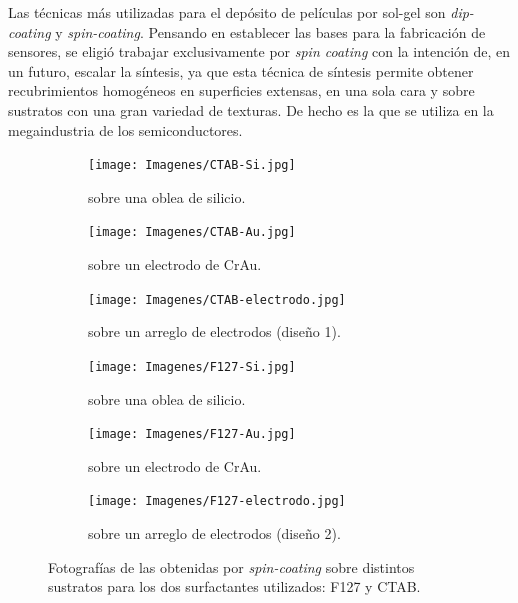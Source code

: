 		Las técnicas más utilizadas para el depósito de películas por sol-gel son \textit{dip-coating} y \textit{spin-coating}. 
		Pensando en establecer las bases para la fabricación de sensores, se eligió trabajar exclusivamente por \textit{spin coating} con la intención de, en un futuro, escalar la síntesis, ya que esta técnica de síntesis permite obtener recubrimientos homogéneos en superficies extensas, en una sola cara y sobre sustratos con una gran variedad de texturas. De hecho es la que se utiliza en la megaindustria de los semiconductores.\cite{Franssila2004,Jaeger2001} 

		

			\begin{figure}[hb!]
	 	   	    \begin{subfigure}[t]{0.325\textwidth}
		        	\texttt{[image: Imagenes/CTAB-Si.jpg]}
		       		\caption{\pdmC\space sobre una oblea de silicio.}
		         	\label{fig:F127_vidrio}
		     		\end{subfigure}
	     		\begin{subfigure}[t]{0.325\textwidth}
		        	\texttt{[image: Imagenes/CTAB-Au.jpg]}
		       		\caption{\pdmC\space sobre un electrodo de Cr\textbar Au.}
		         	\label{fig:F127_silicio}
		     		\end{subfigure}
	     		\begin{subfigure}[t]{0.325\textwidth}
		        	\texttt{[image: Imagenes/CTAB-electrodo.jpg]}
		       		\caption{\pdmC\space sobre un arreglo de electrodos (diseño 1).}
		         	\label{fig:F127_Au}
		     		\end{subfigure}
	 	   	    \begin{subfigure}[t]{0.325\textwidth}
		        	\texttt{[image: Imagenes/F127-Si.jpg]}
		       		\caption{\pdmF\space sobre una oblea de silicio.}
		         	\label{fig:CTAB_vidrio}
		     		\end{subfigure}
	     		\begin{subfigure}[t]{0.325\textwidth}
		        	\texttt{[image: Imagenes/F127-Au.jpg]}
		       		\caption{\pdmF\space sobre un electrodo de Cr\textbar Au.}
		         	\label{fig:CTAB_silicio}
		     		\end{subfigure}
	     		\begin{subfigure}[t]{0.325\textwidth}
		        	\texttt{[image: Imagenes/F127-electrodo.jpg]}
		       		\caption{\pdmF\space sobre un arreglo de electrodos (diseño 2).}
		         	\label{fig:CTAB_Au}
		     		\end{subfigure}
	     		\caption[Películas mesoporosas sobre distintos soportes.]{Fotografías de las \pdm\space obtenidas por \textit{spin-coating }sobre distintos sustratos para los dos surfactantes utilizados: F127 y CTAB.}
	     		\label{fig:fotos_films}
	     	   	\end{figure}

